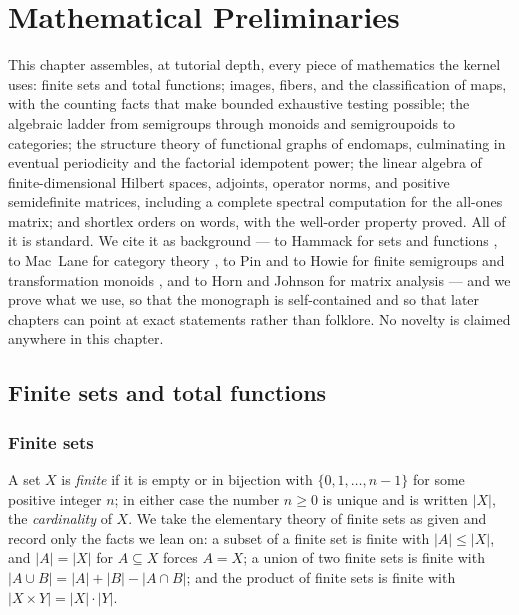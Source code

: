 \chapter{Mathematical Preliminaries}\label{ch02:chap}

This chapter assembles, at tutorial depth, every piece of mathematics the
kernel uses: finite sets and total functions; images, fibers, and the
classification of maps, with the counting facts that make bounded exhaustive
testing possible; the algebraic ladder from semigroups through monoids and
semigroupoids to categories; the structure theory of functional graphs of
endomaps, culminating in eventual periodicity and the factorial idempotent
power; the linear algebra of finite-dimensional Hilbert spaces, adjoints,
operator norms, and positive semidefinite matrices, including a complete
spectral computation for the all-ones matrix; and shortlex orders on words,
with the well-order property proved. All of it is standard. We cite it as
background --- to Hammack for sets and functions \cite{bookofproof}, to
Mac~Lane for category theory \cite{maclanecwm}, to Pin and to Howie for
finite semigroups and transformation monoids \cite{pin, howie}, and to Horn
and Johnson for matrix analysis \cite{horn} --- and we prove what we use, so
that the monograph is self-contained and so that later chapters can point at
exact statements rather than folklore. No novelty is claimed anywhere in
this chapter.

\section{Finite sets and total functions}\label{ch02:sec:finsets}

\subsection{Finite sets}

A set $X$ is \emph{finite} if it is empty or in bijection with
$\{0, 1, \dots, n-1\}$ for some positive integer $n$; in either case the
number $n \geq 0$ is unique and is written $|X|$, the \emph{cardinality} of
$X$. We take the elementary theory of finite sets as given
\cite{bookofproof} and record only the facts we lean on: a subset of a
finite set is finite with $|A| \leq |X|$, and $|A| = |X|$ for
$A \subseteq X$ forces $A = X$; a union of two finite sets is finite with
$|A \cup B| = |A| + |B| - |A \cap B|$; and the product of finite sets is
finite with $|X \times Y| = |X| \cdot |Y|$.

